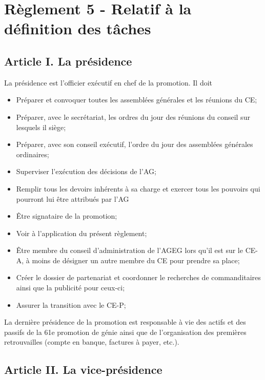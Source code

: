 \section*{Règlement 5 - Relatif à la définition des tâches} 

\subsection*{Article I. La présidence}
La présidence est l'officier exécutif en chef de la promotion. Il doit
\begin{itemize}
    \item Préparer et convoquer toutes les assemblées générales et les réunions du CE;
    \item Préparer, avec le secrétariat, les ordres du jour des réunions du conseil sur lesquels il siège;
    \item Préparer, avec son conseil exécutif, l’ordre du jour des assemblées générales ordinaires;
    \item Superviser l'exécution des décisions de l'AG;
    \item Remplir tous les devoirs inhérents à sa charge et exercer tous les pouvoirs qui pourront lui être attribués par l'AG
    \item Être signataire de la promotion;
    \item Voir à l'application du présent règlement;
    \item Être membre du conseil d’administration de l’AGEG lors qu’il est sur le CE-A, à moins de désigner un autre membre du CE pour prendre sa place;
    \item Créer le dossier de partenariat et coordonner le recherches de commanditaires ainsi que la publicité pour ceux-ci;
    \item Assurer la transition avec le CE-P;
\end{itemize}

La dernière présidence de la promotion est responsable à vie des actifs et des passifs de la 61e promotion de génie ainsi que de l'organisation des premières retrouvailles (compte en banque, factures à payer, etc.).

\subsection*{Article II. La vice-présidence}

